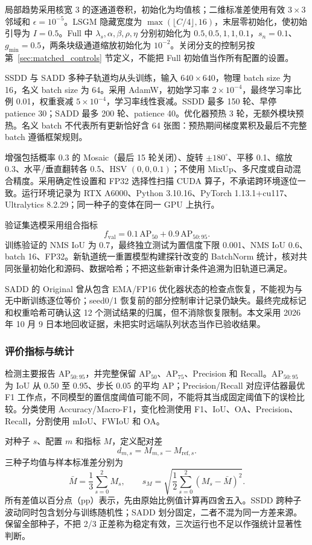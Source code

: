 局部趋势采用核宽 3 的逐通道卷积，初始化为均值核；二维标准差使用有效 $3\times3$ 邻域和 $\epsilon=10^{-5}$。LSGM 隐藏宽度为 $\max(\lfloor C/4\rfloor,16)$，末层零初始化，使初始引导为 $I=0.5$。Full 中 $\lambda_s,\alpha,\beta,\rho,\eta$ 分别初始化为 $0.5,0.5,1,1,0.1$，$s_n=0.1$、$g_{\min}=0.5$，两条块级通道缩放初始化为 $10^{-2}$。关闭分支的控制另按第~\ref{sec:matched_controls} 节定义，不能把 Full 初始值当作所有配置的设置。

SSDD 与 SADD 多种子轨道均从头训练，输入 $640\times640$，物理 batch size 为 16，名义 batch size 为 64。采用 AdamW，初始学习率 $2\times10^{-4}$，最终学习率比例 0.01，权重衰减 $5\times10^{-4}$，学习率线性衰减。SSDD 最多 150 轮、早停 patience 30；SADD 最多 200 轮、patience 40。优化器预热 3 轮，无额外模块预热。名义 batch 不代表所有更新恰好含 64 张图：预热期间梯度累积及最后不完整 batch 遵循框架规则。

增强包括概率 0.3 的 Mosaic（最后 15 轮关闭）、旋转 $\pm180^\circ$、平移 0.1、缩放 0.3、水平/垂直翻转各 0.5、HSV $(0,0,0.1)$；不使用 MixUp、多尺度或自动混合精度。采用确定性设置和 FP32 选择性扫描 CUDA 算子，不承诺跨环境逐位一致。运行环境记录为 RTX A6000、Python 3.10.16、PyTorch 1.13.1+cu117、Ultralytics 8.2.29；同一种子的变体在同一 GPU 上执行。

验证集选模采用组合指标
\begin{equation}
f_{\mathrm{val}}=0.1\,\mathrm{AP}_{50}+0.9\,\mathrm{AP}_{50:95}.
\label{eq:selection_fitness}
\end{equation}
训练验证的 NMS IoU 为 0.7，最终独立测试为置信度下限 0.001、NMS IoU 0.6、batch 16、FP32。新轨道统一重置模型构建探针改变的 BatchNorm 统计，核对共同张量初始化和源码、数据哈希；不把这些新审计条件追溯为旧轨道已满足。

SADD 的 Original 曾从包含 EMA/FP16 优化器状态的检查点恢复，不能视为与无中断训练逐位等价；seed0/1 恢复前的部分控制审计记录仍缺失。最终完成标记和权重哈希可确认这 12 个测试结果的归属，但不消除恢复限制。本文采用 2026 年 10 月 9 日本地回收证据，未把实时远端队列状态当作已验收结果。

\subsubsection{评价指标与统计}\label{sec:evaluation_metrics}
检测主要报告 AP$_{50:95}$，并完整保留 AP$_{50}$、AP$_{75}$、Precision 和 Recall。AP$_{50:95}$ 为 IoU 从 0.50 至 0.95、步长 0.05 的平均 AP；Precision/Recall 对应评估器最优 F1 工作点，不同模型的置信度阈值可能不同，不能将其当成固定阈值下的误检比较。分类使用 Accuracy/Macro-F1，变化检测使用 F1、IoU、OA、Precision、Recall，分割使用 mIoU、FWIoU 和 OA。

对种子 $s$、配置 $m$ 和指标 $M$，定义配对差
\begin{equation}
d_{m,s}=M_{m,s}-M_{\mathrm{ref},s}.
\label{eq:paired_difference}
\end{equation}
三种子均值与样本标准差分别为
\begin{equation}
\bar M=\frac{1}{3}\sum_{s=0}^{2}M_s,\qquad
s_M=\sqrt{\frac{1}{2}\sum_{s=0}^{2}(M_s-\bar M)^2}.
\end{equation}
所有差值以百分点（pp）表示，先由原始比例值计算再四舍五入。SSDD 跨种子波动同时包含划分与训练随机性；SADD 划分固定，二者不混为同一方差来源。保留全部种子，不把 2/3 正差称为稳定有效，三次运行也不足以作强统计显著性判断。
